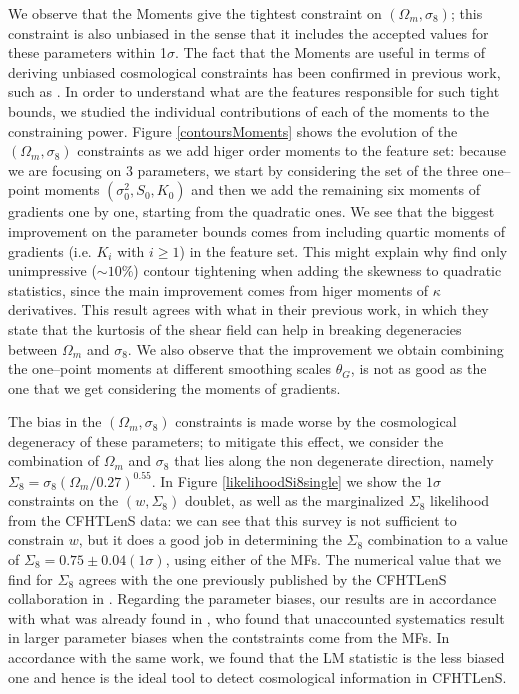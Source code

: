 \documentclass[reprint,aps,prd,superscriptaddress,showkeys,showpacs]{revtex4-1}
\begin{document}
We observe that the Moments give the tightest constraint on $(\Omega_m,\sigma_8)$; this constraint is also unbiased in the sense that it includes the accepted values for these parameters within 1$\sigma$. The fact that the Moments are useful in terms of deriving unbiased cosmological constraints has been confirmed in previous work, such as \citep{PetriSpurious}. In order to understand what are the features responsible for such tight bounds, we studied the individual contributions of each of the moments to the constraining power. Figure \ref{contoursMoments} shows the evolution of the $(\Omega_m,\sigma_8)$ constraints as we add higer order moments to the feature set: because we are focusing on 3 parameters, we start by considering the set of the three one--point moments $(\sigma_0^2,S_0,K_0)$ and then we add the remaining six moments of gradients one by one, starting from the quadratic ones. We see that the biggest improvement on the parameter bounds comes from including quartic moments of gradients (i.e. $K_i$ with $i\ge1$) in the feature set. This might explain why \citep{CFHTFu} find only unimpressive ($\sim10\%$) contour tightening when adding the skewness to quadratic statistics, since the main improvement comes from higer moments of $\kappa$ derivatives. This result agrees with what \citep{BhuvKurtosis} in their previous work, in which they state that the kurtosis of the shear field can help in breaking degeneracies between $\Omega_m$ and $\sigma_8$. We also observe that the improvement we obtain combining the one--point moments at different smoothing scales $\theta_G$, is not as good as the one that we get considering the moments of gradients.      

The bias in the $(\Omega_m,\sigma_8)$ constraints is made worse by the cosmological degeneracy of these parameters; to mitigate this effect, we consider the combination of $\Omega_m$ and $\sigma_8$ that lies along the non degenerate direction, namely $\Sigma_8=\sigma_8(\Omega_m/0.27)^{0.55}$. In Figure \ref{likelihoodSi8single} we show the $1\sigma$ constraints on the $(w,\Sigma_8)$ doublet, as well as the marginalized $\Sigma_8$ likelihood from the CFHTLenS data: we can see that this survey is not sufficient to constrain $w$, but it does a good job in determining the $\Sigma_8$ combination to a value of $\Sigma_8=0.75\pm0.04(1\sigma)$, using either of the MFs. The numerical value that we find for $\Sigma_8$ agrees with the one previously published by the CFHTLenS collaboration in \citep{CFHTKilbinger}. Regarding the parameter biases, our results are in accordance with what was already found in \citep{PetriSpurious}, who found that unaccounted systematics result in larger parameter biases when the contstraints come from the MFs. In accordance with the same work, we found that the LM statistic is the less biased one and hence is the ideal tool to detect cosmological information in CFHTLenS. 
\end{document}
